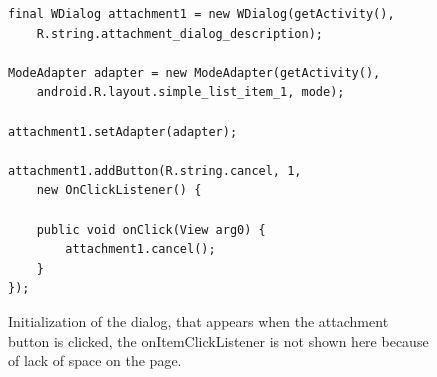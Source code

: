 \begin{figure}[H]
\begin{lstlisting}
final WDialog attachment1 = new WDialog(getActivity(),
	R.string.attachment_dialog_description);

ModeAdapter adapter = new ModeAdapter(getActivity(),
	android.R.layout.simple_list_item_1, mode);

attachment1.setAdapter(adapter);

attachment1.addButton(R.string.cancel, 1,
	new OnClickListener() {

	public void onClick(View arg0) {
		attachment1.cancel();
	}
});
\end{lstlisting}
\caption{Initialization of the dialog, that appears when the attachment button is clicked, the onItemClickListener is not shown here because of lack of space on the page.}%
\label{code:customize:wdialog}%
\end{figure}